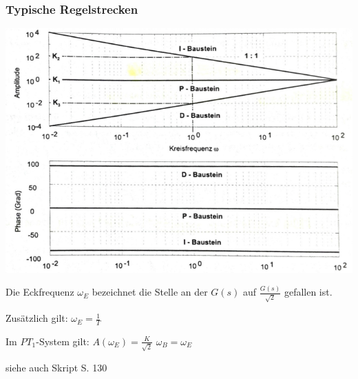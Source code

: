 \documentclass[fs, footer]{latex4ei}
\begin{document}
\begin{multicols*}{4}
{	

	\subsubsection{Typische Regelstrecken}
	
	\includegraphics[width=\columnwidth]{img/Bode-Diagramme_Regler.pdf}
	
	Die Eckfrequenz $\omega_E$ bezeichnet die Stelle an der $G(s)$ auf $\frac{G(s)}{\sqrt 2}$ gefallen ist.
	
	Zusätzlich gilt: $\omega_E = \frac 1 T$
	
	Im $PT_1$-System gilt:
	$A (\omega_E) = \frac{K}{\sqrt 2}$ \quad $\omega_B = \omega_E$
	
	siehe auch Skript S. 130
}

\end{multicols*}
\end{document}
